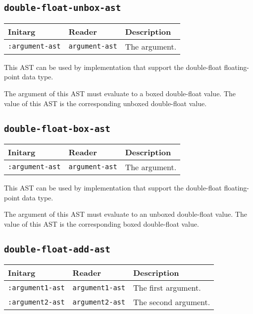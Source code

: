 \subsection{\texttt{double-float-unbox-ast}}
\label{sec-ast-double-float-unbox}

\begin{tabular}{|l|l|l|}
\hline
Initarg & Reader & Description\\
\hline\hline
\texttt{:argument-ast} & \texttt{argument-ast} & The argument.\\
\hline
\end{tabular}

This AST can be used by implementation that support the double-float
floating-point data type.  

The argument of this AST must evaluate to a boxed double-float value.
The value of this AST is the corresponding unboxed double-float value.

\subsection{\texttt{double-float-box-ast}}
\label{sec-ast-double-float-box}

\begin{tabular}{|l|l|l|}
\hline
Initarg & Reader & Description\\
\hline\hline
\texttt{:argument-ast} & \texttt{argument-ast} & The argument.\\
\hline
\end{tabular}

This AST can be used by implementation that support the double-float
floating-point data type.  

The argument of this AST must evaluate to an unboxed double-float
value.  The value of this AST is the corresponding boxed double-float
value.

\subsection{\texttt{double-float-add-ast}}
\label{sec-ast-double-float-add}

\begin{tabular}{|l|l|l|}
\hline
Initarg & Reader & Description\\
\hline\hline
\texttt{:argument1-ast} & \texttt{argument1-ast} & The first argument.\\
\hline
\texttt{:argument2-ast} & \texttt{argument2-ast} & The second argument.\\
\hline
\end{tabular}

